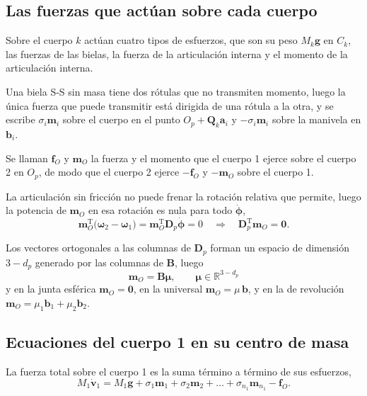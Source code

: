 \documentclass[11pt]{article}
\newcommand{\T}{^{\mathrm{T}}}
\newcommand{\wv}{\boldsymbol{\omega}}
\newcommand{\muv}{\boldsymbol{\mu}}
\begin{document}
\subsection{Las fuerzas que actúan sobre cada cuerpo}

Sobre el cuerpo $k$ actúan cuatro tipos de esfuerzos, que son su peso $M_k\mathbf{g}$ en $C_k$, las fuerzas de las bielas, la fuerza de la articulación interna y el momento de la articulación interna.

Una biela S-S sin masa tiene dos rótulas que no transmiten momento, luego la única fuerza que puede transmitir está dirigida de una rótula a la otra, y se escribe $\sigma_i\mathbf{m}_i$ sobre el cuerpo en el punto $O_p+\mathbf{Q}_k\mathbf{a}_i$ y $-\sigma_i\mathbf{m}_i$ sobre la manivela en $\mathbf{b}_i$.

Se llaman $\mathbf{f}_O$ y $\mathbf{m}_O$ la fuerza y el momento que el cuerpo 1 ejerce sobre el cuerpo 2 en $O_p$, de modo que el cuerpo 2 ejerce $-\mathbf{f}_O$ y $-\mathbf{m}_O$ sobre el cuerpo 1.

La articulación sin fricción no puede frenar la rotación relativa que permite, luego la potencia de $\mathbf{m}_O$ en esa rotación es nula para todo $\dot{\boldsymbol{\phi}}$,
\begin{equation}
\mathbf{m}_O\T\big(\wv_2-\wv_1\big)=\mathbf{m}_O\T\mathbf{D}_p\dot{\boldsymbol{\phi}}=0
\quad\Longrightarrow\quad
\mathbf{D}_p\T\mathbf{m}_O=\mathbf{0}.
\label{eq:mOperp}
\end{equation}

Los vectores ortogonales a las columnas de $\mathbf{D}_p$ forman un espacio de dimensión $3-d_p$ generado por las columnas de $\mathbf{B}$, luego
\begin{equation}
\boxed{\ \mathbf{m}_O=\mathbf{B}\muv,
\qquad
\muv\in\mathbb{R}^{3-d_p}\ }
\label{eq:mOB}
\end{equation}
y en la junta esférica $\mathbf{m}_O=\mathbf{0}$, en la universal $\mathbf{m}_O=\mu\,\mathbf{b}$, y en la de revolución $\mathbf{m}_O=\mu_1\mathbf{b}_1+\mu_2\mathbf{b}_2$.

\subsection{Ecuaciones del cuerpo 1 en su centro de masa}

La fuerza total sobre el cuerpo 1 es la suma término a término de sus esfuerzos,
\begin{equation}
M_1\dot{\mathbf{v}}_1=M_1\mathbf{g}+\sigma_1\mathbf{m}_1+\sigma_2\mathbf{m}_2+\dots+\sigma_{n_1}\mathbf{m}_{n_1}-\mathbf{f}_O .
\label{eq:N1C}
\end{equation}
\end{document}
